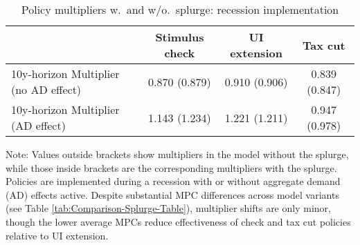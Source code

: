 \documentclass[qe]{econsocart}
\begin{document}
\begin{table}[tb] 
  \caption{Policy multipliers w.\ and w/o.\ splurge: recession implementation}
  \label{tab:Multiplier-SplurgeComp} 
  \centering

  \begin{tabular*}
    {\textwidth}{@{\extracolsep{\fill}}lccc@{}}
    \hline
    & Stimulus check & UI extension & Tax cut \\ \hline
    10y-horizon Multiplier (no AD effect) & 0.870 (0.879) & 0.910 (0.906) & 0.839 (0.847) \\
    10y-horizon Multiplier (AD effect)    & 1.143 (1.234) & 1.221 (1.211) & 0.947 (0.978) \\
    \hline
  \end{tabular*}

  \noindent\parbox{\textwidth}{
    \medskip
    \footnotesize Note: Values outside brackets show multipliers in the model without the splurge, while those inside brackets are the corresponding multipliers with the splurge. Policies are implemented during a recession with or without aggregate demand (AD) effects active. Despite substantial MPC differences across model variants (see Table \ref{tab:Comparison-Splurge-Table}), multiplier shifts are only minor, though the lower average MPCs reduce effectiveness of check and tax cut policies relative to UI extension.
  }
\end{table}

\vspace{0.5em}

\FloatBarrier

\clearpage
{}

\clearpage


\end{document}
